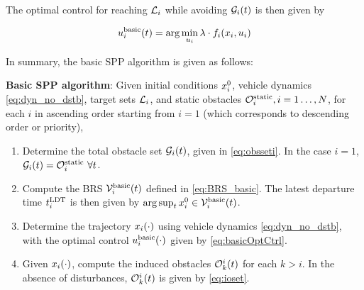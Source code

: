 The optimal control for reaching $\mathcal{L}_i$ while avoiding $\mathcal{G}_i(t)$ is then given by

\begin{equation}
\label{eq:basicOptCtrl}
\ctrl_i^\text{basic}(t) = \arg \min_{\ctrl_i} \costate \cdot \fdyn_i(\state_i, \ctrl_i)
\end{equation}

In summary, the basic SPP algorithm is given as follows:

\begin{alg}
\label{alg:basic}
\textbf{Basic SPP algorithm}: Given initial conditions $x_i^0$, vehicle dynamics \eqref{eq:dyn_no_dstb}, target sets $\mathcal{L}_i$, and static obstacles $\mathcal{O}^\text{static}_i, i = 1\ldots, N$, for each $i$ in ascending order starting from $i=1$ (which corresponds to descending order or priority),
\begin{enumerate}
\item Determine the total obstacle set $\mathcal{G}_i(t)$, given in \eqref{eq:obsseti}. In the case $i=1$, $\mathcal{G}_i(t) = \mathcal{O}^\text{static}_i ~ \forall t$.
\item Compute the BRS $\mathcal{V}_i^\text{basic}(t)$ defined in \eqref{eq:BRS_basic}. The latest departure time $t^\text{LDT}_i$ is then given by $\arg \sup_t x^0_i \in \mathcal{V}_i^\text{basic}(t)$.
\item Determine the trajectory $x_i(\cdot)$ using vehicle dynamics \eqref{eq:dyn_no_dstb}, with the optimal control  $u_i^\text{basic}(\cdot)$ given by \eqref{eq:basicOptCtrl}.
\item Given $x_i(\cdot)$, compute the induced obstacles $\mathcal{O}_k^i(t)$ for each $k>i$. In the absence of disturbances, $\mathcal{O}_k^i(t)$ is given by \eqref{eq:ioset}.
\end{enumerate}
\end{alg}